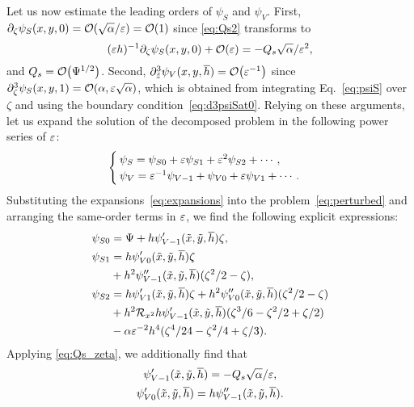 Let us now estimate the leading orders of $\psi_S$ and $\psi_V$. First, $\pzeta\psi_S(x,y,0) = \order{\sqrt\alpha/\eps} = \order{1}$ since \cref{eq:Qs2} transforms to
\begin{equation}\label{eq:Qs_zeta}
    (\eps h)^{-1}\pzeta\psi_S(x,y,0) + \order{\eps} = -Q_s\sqrt\alpha/\eps^2,
\end{equation}
and $Q_s = \order{\Psi^{1/2}}$. Second, $\ptz^3\psi_V(x,y,\hav) = \order{\eps^{-1}}$ since $\pzeta^3\psi_S(x,y,1) = \order{\alpha,\eps\sqrt\alpha}$, which is obtained from integrating Eq.~\eqref{eq:psiS} over $\zeta$ and using the boundary condition~\eqref{eq:d3psiSat0}. Relying on these arguments, let us expand the solution of the decomposed problem in the following power series of $\varepsilon$:
\begin{equation}\label{eq:expansions}
    \begin{cases}
        \psi_S = \psi_{S0} + \varepsilon\psi_{S1} + \varepsilon^2\psi_{S2} + \cdots, \\
        \psi_V = \varepsilon^{-1}\psi_{V-1} + \psi_{V0} + \varepsilon\psi_{V1} + \cdots.
    \end{cases}
\end{equation}
Substituting the expansions~\eqref{eq:expansions} into the problem~\eqref{eq:perturbed} and arranging the same-order terms in $\varepsilon$, we find the following explicit expressions:
\begin{align}
    \psi_{S0} &= \Psi + h\psi_{V-1}'(\tilde{x},\tilde{y},\overline{h})\zeta, \label{eq:psiS0}\\
    \psi_{S1} &= h\psi_{V0}'(\tilde{x},\tilde{y},\overline{h})\zeta \nonumber\\
        &+ h^2\psi_{V-1}''(\tilde{x},\tilde{y},\overline{h})(\zeta^2/2-\zeta), \label{eq:psiS1}\\
    \psi_{S2} &= h\psi_{V1}'(\tilde{x},\tilde{y},\overline{h})\zeta + h^2\psi_{V0}''(\tilde{x},\tilde{y},\overline{h})(\zeta^2/2-\zeta) \nonumber\\
        &+ h^2\mathcal{R}_{x^2}h\psi_{V-1}'(\tilde{x},\tilde{y},\overline{h})(\zeta^3/6-\zeta^2/2+\zeta/2) \nonumber\\
        &- \alpha\varepsilon^{-2}h^4(\zeta^4/24-\zeta^2/4+\zeta/3). \label{eq:psiS2}
\end{align}
Applying \cref{eq:Qs_zeta}, we additionally find that
\begin{gather}
    \psi_{V-1}'(\tilde{x},\tilde{y},\overline{h}) = -Q_s\sqrt\alpha/\varepsilon, \label{eq:Qs_psiV}\\
    \psi_{V0}'(\tilde{x},\tilde{y},\overline{h}) = h\psi_{V-1}''(\tilde{x},\tilde{y},\overline{h}). \label{eq:dpsiV0}
\end{gather}

